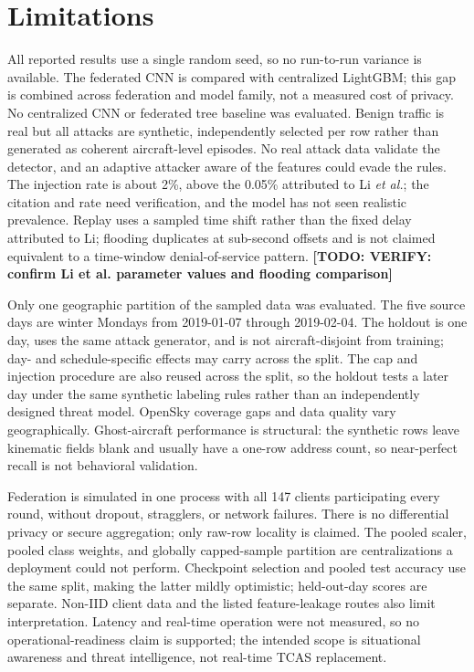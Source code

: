 \documentclass[conference]{IEEEtran}
\newcommand{\todo}[1]{\textbf{[TODO: #1]}}
\begin{document}
\section{Limitations}
All reported results use a single random seed, so no run-to-run variance is available. The federated CNN is compared with centralized LightGBM; this gap is combined across federation and model family, not a measured cost of privacy. No centralized CNN or federated tree baseline was evaluated. Benign traffic is real but all attacks are synthetic, independently selected per row rather than generated as coherent aircraft-level episodes. No real attack data validate the detector, and an adaptive attacker aware of the features could evade the rules. The injection rate is about 2\%, above the 0.05\% attributed to Li \emph{et al.}; the citation and rate need verification, and the model has not seen realistic prevalence. Replay uses a sampled time shift rather than the fixed delay attributed to Li; flooding duplicates at sub-second offsets and is not claimed equivalent to a time-window denial-of-service pattern. \todo{VERIFY: confirm Li et al. parameter values and flooding comparison}

Only one geographic partition of the sampled data was evaluated. The five source days are winter Mondays from 2019-01-07 through 2019-02-04. The holdout is one day, uses the same attack generator, and is not aircraft-disjoint from training; day- and schedule-specific effects may carry across the split. The cap and injection procedure are also reused across the split, so the holdout tests a later day under the same synthetic labeling rules rather than an independently designed threat model. OpenSky coverage gaps and data quality vary geographically. Ghost-aircraft performance is structural: the synthetic rows leave kinematic fields blank and usually have a one-row address count, so near-perfect recall is not behavioral validation.

Federation is simulated in one process with all 147 clients participating every round, without dropout, stragglers, or network failures. There is no differential privacy or secure aggregation; only raw-row locality is claimed. The pooled scaler, pooled class weights, and globally capped-sample partition are centralizations a deployment could not perform. Checkpoint selection and pooled test accuracy use the same split, making the latter mildly optimistic; held-out-day scores are separate. Non-IID client data and the listed feature-leakage routes also limit interpretation. Latency and real-time operation were not measured, so no operational-readiness claim is supported; the intended scope is situational awareness and threat intelligence, not real-time TCAS replacement.
\end{document}
